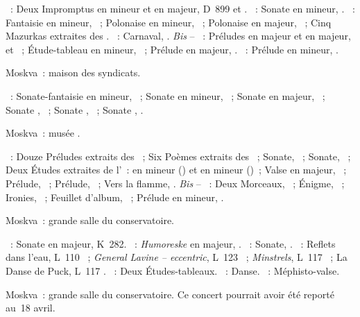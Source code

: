 \begin{description}
 \textsc{\Schubert{}}~: Deux Impromptus en \kC mineur et en \kA \Flat
 majeur, D~899  et .
 \textsc{\Beethoven{}}~: Sonate en \kC \Sharp mineur,  .
 \textsc{\Chopin{}}~: Fantaisie en \kF mineur, ~; Polonaise en \kC
 \Sharp mineur,  ~; Polonaise en \kA majeur, 
 ~; Cinq Mazurkas extraites des .
 \textsc{\Schumann{}}~: Carnaval, .
 \emph{Bis} -- \textsc{\Rachmaninov{}}~: Préludes en \kE \Flat majeur et en
 \kE majeur,   et  ~; Étude-tableau en
 \kB mineur,  ~; Prélude en \kG majeur, 
 .
 \textsc{\Scriabine{}}~: Prélude en \kB mineur,  .
 \item[\DateWithWeekDay{1947-03-15}]
 Moskva~: maison des syndicats.

 \textsc{\Scriabine{}}~: Sonate-fantaisie  en \kG \Sharp mineur,
 ~; Sonate  en \kF \Sharp mineur, ~; Sonate
  en \kF \Sharp majeur, ~; Sonate , ~;
 Sonate , ~; Sonate , .
 \item[\DateWithWeekDay{1947-03-18}]
 Moskva~: musée \Scriabine{}.

 \textsc{\Scriabine{}}~: Douze Préludes extraits des ~; Six Poèmes extraits des ~; Sonate,
 ~; Sonate, ~; Deux Études extraites de l'~: en
 \kB \Flat mineur () et en \kB \Flat mineur ()~; Valse
 en \kA \Flat majeur, ~; Prélude,  ~; Prélude,
  ~; Vers la flamme, .
 \emph{Bis} -- \textsc{\Scriabine{}}~: Deux Morceaux, ~; Énigme,
  ~; Ironies,  ~; Feuillet d'album,
 ~; Prélude en \kF mineur,  .
 \item[\DateWithWeekDay{1947-03-26}]
 Moskva~: grande salle du conservatoire.

 \textsc{\Mozart{}}~: Sonate en \kE \Flat majeur, K~282.
 \textsc{\Schumann{}}~: \emph{Humoreske} en \kB \Flat majeur, .
 \textsc{\Scriabine{}}~: Sonate, .
 \textsc{\Debussy{}}~: Reflets dans l'eau, L~110 ~; \emph{General
 Lavine -- eccentric}, L~123 ~; \emph{Minstrels}, L~117
 ~; La Danse de Puck, L~117 .
 \textsc{\Rachmaninov{}}~: Deux Études-tableaux.
 \textsc{\Prokofiev{}}~: Danse.
 \textsc{\Liszt{}}~: Méphisto-valse.
 \item[\DateWithWeekDay{1947-04-13}]
 Moskva~: grande salle du conservatoire.
 Ce concert pourrait avoir été reporté au~18 avril.


\end{description}
